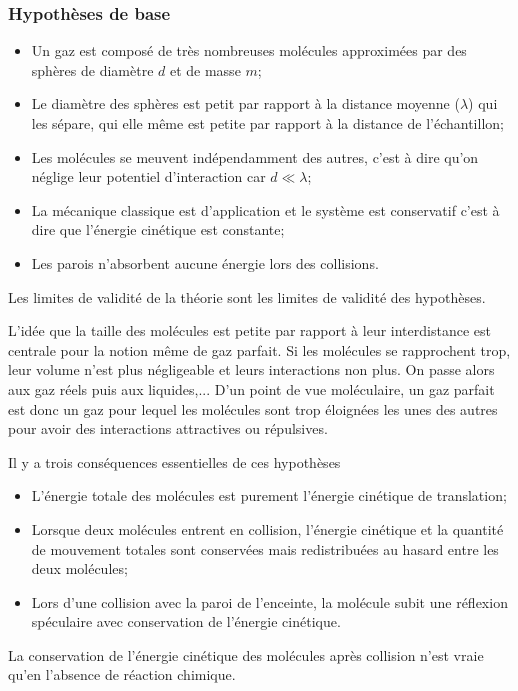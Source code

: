 \subsubsection{Hypothèses de base}
\begin{itemize}
  \item Un gaz est composé de très nombreuses molécules approximées
    par des sphères de diamètre $d$ et de masse $m$;
  \item Le diamètre des sphères est petit par rapport
    à la distance moyenne ($\lambda$) qui les sépare, qui elle même est petite
    par rapport à la distance de l'échantillon;
  \item Les molécules se meuvent indépendamment des autres,
    c'est à dire qu'on néglige leur potentiel d'interaction car $d \ll \lambda$;
  \item La mécanique classique est d'application et le système est conservatif
    c'est à dire que l'énergie cinétique est constante;
  \item Les parois n'absorbent aucune énergie lors des collisions.
\end{itemize}
Les limites de validité de la théorie sont
les limites de validité des hypothèses.

L'idée que la taille des molécules est petite par rapport à leur interdistance
est centrale pour la notion même de gaz parfait.
Si les molécules se rapprochent trop,
leur volume n'est plus négligeable et leurs interactions non plus.
On passe alors aux gaz réels puis aux liquides,...
D'un point de vue moléculaire,
un gaz parfait est donc un gaz pour lequel les molécules sont
trop éloignées les unes des autres pour avoir des interactions attractives ou
répulsives.

Il y a trois conséquences essentielles de ces hypothèses
\begin{itemize}
  \item L'énergie totale des molécules est purement
    l'énergie cinétique de translation;
  \item Lorsque deux molécules entrent en collision,
    l'énergie cinétique et la quantité de mouvement totales sont
    conservées mais redistribuées au hasard entre les deux molécules;
  \item Lors d'une collision avec la paroi de l'enceinte,
    la molécule subit une réflexion spéculaire avec conservation
    de l'énergie cinétique.
\end{itemize}
La conservation de l'énergie cinétique des molécules après collision
n'est vraie qu'en l'absence de réaction chimique.

